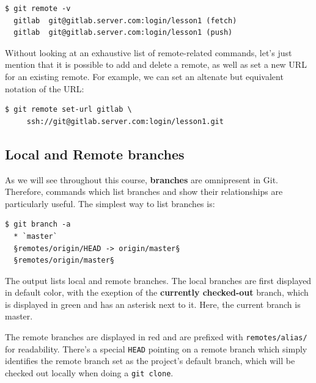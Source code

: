 \documentclass{../common/tufte-latex/tufte-handout}
\begin{document}
\begin{lstlisting}[style=BashInputStyle]
  $ git remote -v
  gitlab  git@gitlab.server.com:login/lesson1 (fetch)
  gitlab  git@gitlab.server.com:login/lesson1 (push)
\end{lstlisting}

Without looking at an exhaustive list of remote-related commands, let's just mention that it is possible to add and delete a remote, as well as set a new URL for an existing remote.
For example, we can set an altenate but equivalent notation of the URL:


\begin{lstlisting}[style=BashInputStyle]
  $ git remote set-url gitlab \
     ssh://git@gitlab.server.com:login/lesson1.git
\end{lstlisting}

\subsection{Local and Remote branches}

As we will see throughout this course, \textbf{branches} are omnipresent in Git.
Therefore, commands which list branches and show their relationships are particularly useful.
The simplest way to list branches is:


\begin{lstlisting}[style=BashInputStyle]
  $ git branch -a
  * `master`
  §remotes/origin/HEAD -> origin/master§
  §remotes/origin/master§
\end{lstlisting}

The output lists local and remote branches.
The local branches are first displayed in default color, with the exeption of the \textbf{currently checked-out} branch, which is displayed in green and has an asterisk next to it.
Here, the current branch is master.

The remote branches are displayed in red and are prefixed with \texttt{remotes/alias/} for readability.
There's a special \texttt{HEAD} pointing on a remote branch which simply identifies the remote branch set as the project's default branch, which will be checked out locally when doing a \texttt{git clone}.
\end{document}
